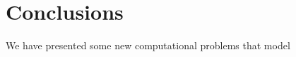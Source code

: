 \section{Conclusions}

We have presented some new computational problems that model\cite{bonizzoni_when_2014}



